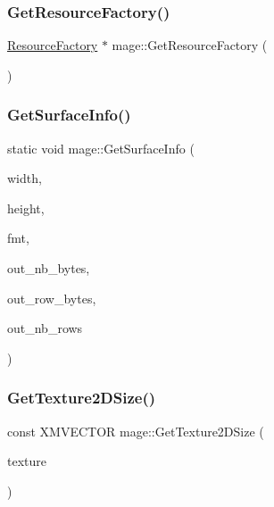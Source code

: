 \subsubsection{\texorpdfstring{Get\+Resource\+Factory()}{GetResourceFactory()}}
{\footnotesize\ttfamily \hyperlink{classmage_1_1_resource_factory}{Resource\+Factory} $\ast$ mage\+::\+Get\+Resource\+Factory (\begin{DoxyParamCaption}{ }\end{DoxyParamCaption})}

\hypertarget{namespacemage_a7b67bb6f38f3e787fb3561d236b88bd2}{}\label{namespacemage_a7b67bb6f38f3e787fb3561d236b88bd2} 
\subsubsection{\texorpdfstring{Get\+Surface\+Info()}{GetSurfaceInfo()}}
{\footnotesize\ttfamily static void mage\+::\+Get\+Surface\+Info (\begin{DoxyParamCaption}\item[{\+\_\+\+In\+\_\+ size\+\_\+t}]{width,  }\item[{\+\_\+\+In\+\_\+ size\+\_\+t}]{height,  }\item[{\+\_\+\+In\+\_\+ D\+X\+G\+I\+\_\+\+F\+O\+R\+M\+AT}]{fmt,  }\item[{\+\_\+\+Out\+\_\+opt\+\_\+ size\+\_\+t $\ast$}]{out\+\_\+nb\+\_\+bytes,  }\item[{\+\_\+\+Out\+\_\+opt\+\_\+ size\+\_\+t $\ast$}]{out\+\_\+row\+\_\+bytes,  }\item[{\+\_\+\+Out\+\_\+opt\+\_\+ size\+\_\+t $\ast$}]{out\+\_\+nb\+\_\+rows }\end{DoxyParamCaption})\hspace{0.3cm}{\ttfamily [static]}}

\hypertarget{namespacemage_a32e962380f439a26629371c492643616}{}\label{namespacemage_a32e962380f439a26629371c492643616} 
\subsubsection{\texorpdfstring{Get\+Texture2\+D\+Size()}{GetTexture2DSize()}}
{\footnotesize\ttfamily const X\+M\+V\+E\+C\+T\+OR mage\+::\+Get\+Texture2\+D\+Size (\begin{DoxyParamCaption}\item[{I\+D3\+D11\+Shader\+Resource\+View $\ast$}]{texture }\end{DoxyParamCaption})}

